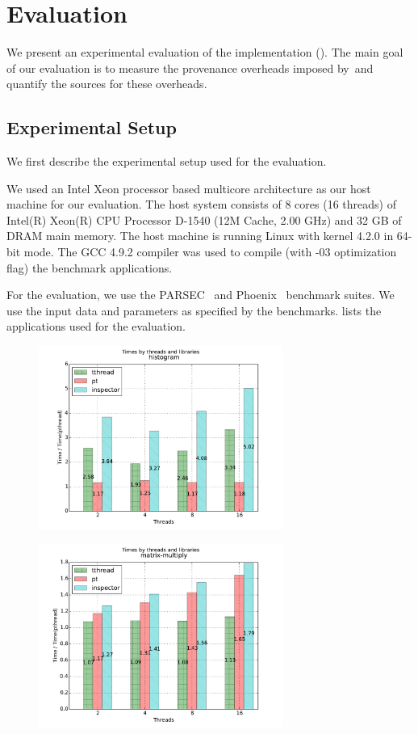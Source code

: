 \section{Evaluation}
\label{sec:evaluation}

We present an experimental evaluation of the \projecttitle implementation (). The main goal of our evaluation is to measure the provenance overheads imposed by~\projecttitle and quantify the sources for these overheads.

\subsection{Experimental Setup}
We first describe the experimental setup used for the evaluation.

 We used an Intel Xeon processor based
multicore architecture as our host machine for our evaluation. The
host system consists of 8 cores (16 threads) of Intel(R) Xeon(R) CPU Processor D-1540
(12M Cache, 2.00 GHz) and 32 GB of DRAM main memory. The host
machine is running Linux with kernel 4.2.0 in 64-bit mode.
The GCC 4.9.2 compiler was used to
compile (with -$03$ optimization flag) the benchmark applications.

  For the evaluation, we use the PARSEC~\cite{parsec} and
Phoenix~\cite{phoenix} benchmark suites. We use
the input data and parameters as specified by the
benchmarks.  lists the applications used for the
evaluation.

\begin{figure}[h]
\includegraphics[width=8cm]{figure/histogram.pdf}
\end{figure}

\begin{figure}[h]
\includegraphics[width=8cm]{figure/matrix-multiply.pdf}
\end{figure}

